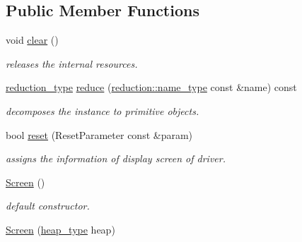 \subsection*{Public Member Functions}
\begin{DoxyCompactItemize}
\item 
\hypertarget{classhryky_1_1display_1_1_screen_a3ccbc0b66d144dca94990e9fc75fac31}{void \hyperlink{classhryky_1_1display_1_1_screen_a3ccbc0b66d144dca94990e9fc75fac31}{clear} ()}\label{classhryky_1_1display_1_1_screen_a3ccbc0b66d144dca94990e9fc75fac31}

\begin{DoxyCompactList}\small\item\em releases the internal resources. \end{DoxyCompactList}\item 
\hypertarget{classhryky_1_1display_1_1_screen_aadc8e49cc79b5b15a65ad7b0e308b266}{\hyperlink{namespacehryky_a343a9a4c36a586be5c2693156200eadc}{reduction\-\_\-type} \hyperlink{classhryky_1_1display_1_1_screen_aadc8e49cc79b5b15a65ad7b0e308b266}{reduce} (\hyperlink{namespacehryky_1_1reduction_ac686c30a4c8d196bbd0f05629a6b921f}{reduction\-::name\-\_\-type} const \&name) const }\label{classhryky_1_1display_1_1_screen_aadc8e49cc79b5b15a65ad7b0e308b266}

\begin{DoxyCompactList}\small\item\em decomposes the instance to primitive objects. \end{DoxyCompactList}\item 
\hypertarget{classhryky_1_1display_1_1_screen_a1c77857a9711011c99c2ec453cce4581}{bool \hyperlink{classhryky_1_1display_1_1_screen_a1c77857a9711011c99c2ec453cce4581}{reset} (Reset\-Parameter const \&param)}\label{classhryky_1_1display_1_1_screen_a1c77857a9711011c99c2ec453cce4581}

\begin{DoxyCompactList}\small\item\em assigns the information of display screen of driver. \end{DoxyCompactList}\item 
\hypertarget{classhryky_1_1display_1_1_screen_a99d2d29f0526e3c8296137df16461202}{\hyperlink{classhryky_1_1display_1_1_screen_a99d2d29f0526e3c8296137df16461202}{Screen} ()}\label{classhryky_1_1display_1_1_screen_a99d2d29f0526e3c8296137df16461202}

\begin{DoxyCompactList}\small\item\em default constructor. \end{DoxyCompactList}\item 
\hypertarget{classhryky_1_1display_1_1_screen_a44d8361c0f52b5a7beb66a1c22fd9480}{\hyperlink{classhryky_1_1display_1_1_screen_a44d8361c0f52b5a7beb66a1c22fd9480}{Screen} (\hyperlink{classhryky_1_1memory_1_1heap_1_1_base}{heap\-\_\-type} heap)}\label{classhryky_1_1display_1_1_screen_a44d8361c0f52b5a7beb66a1c22fd9480}


\end{DoxyCompactItemize}
